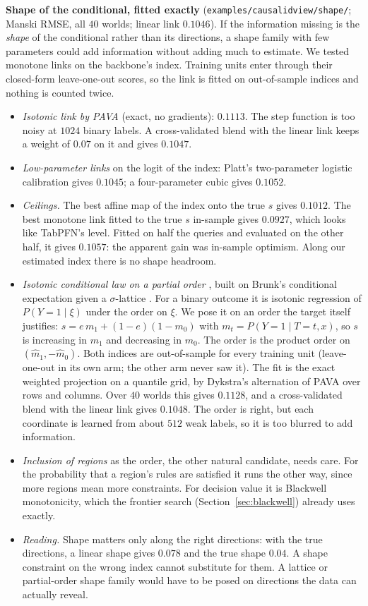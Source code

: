 \documentclass[11pt]{article}
\theoremstyle{definition}
\theoremstyle{remark}
\begin{document}
\textbf{Shape of the conditional, fitted exactly} (\texttt{examples/causalidview/shape/}; Manski RMSE, all $40$ worlds; linear link $0.1046$). If the information missing is the \emph{shape} of the conditional rather than its directions, a shape family with few parameters could add information without adding much to estimate. We tested monotone links on the backbone's index. Training units enter through their closed-form leave-one-out scores, so the link is fitted on out-of-sample indices and nothing is counted twice.
\begin{itemize}
  \item \emph{Isotonic link by PAVA} \cite{robertson88,deleeuw09} (exact, no gradients): $0.1113$. The step function is too noisy at $1024$ binary labels. A cross-validated blend with the linear link keeps a weight of $0.07$ on it and gives $0.1047$.
  \item \emph{Low-parameter links} on the logit of the index: Platt's two-parameter logistic calibration \cite{platt99} gives $0.1045$; a four-parameter cubic gives $0.1052$.
  \item \emph{Ceilings.} The best affine map of the index onto the true $s$ gives $0.1012$. The best monotone link fitted to the true $s$ in-sample gives $0.0927$, which looks like TabPFN's level. Fitted on half the queries and evaluated on the other half, it gives $0.1057$: the apparent gain was in-sample optimism. Along our estimated index there is no shape headroom.
  \item \emph{Isotonic conditional law on a partial order} \cite{arnoldziegel25,henzi21}, built on Brunk's conditional expectation given a $\sigma$-lattice \cite{brunk65}. For a binary outcome it is isotonic regression of $P(Y=1\mid\xi)$ under the order on $\xi$. We pose it on an order the target itself justifies: $s=e\,m_1+(1-e)(1-m_0)$ with $m_t=P(Y=1\mid T=t,x)$, so $s$ is increasing in $m_1$ and decreasing in $m_0$. The order is the product order on $(\hat m_1,-\hat m_0)$. Both indices are out-of-sample for every training unit (leave-one-out in its own arm; the other arm never saw it). The fit is the exact weighted projection on a quantile grid, by Dykstra's alternation of PAVA over rows and columns. Over $40$ worlds this gives $0.1128$, and a cross-validated blend with the linear link gives $0.1048$. The order is right, but each coordinate is learned from about $512$ weak labels, so it is too blurred to add information.
  \item \emph{Inclusion of regions} as the order, the other natural candidate, needs care. For the probability that a region's rules are satisfied it runs the other way, since more regions mean more constraints. For decision value it is Blackwell monotonicity, which the frontier search (Section~\ref{sec:blackwell}) already uses exactly.
  \item \emph{Reading.} Shape matters only along the right directions: with the true directions, a linear shape gives $0.078$ and the true shape $0.04$. A shape constraint on the wrong index cannot substitute for them. A lattice or partial-order shape family would have to be posed on directions the data can actually reveal.
\end{itemize}
\end{document}
